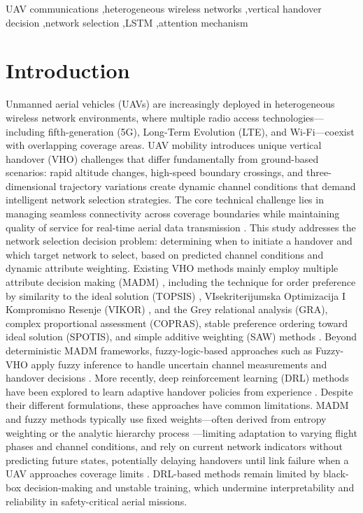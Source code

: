 \documentclass[preprint,12pt]{elsarticle}
\begin{document}
\begin{frontmatter}
\begin{keyword}
UAV communications \sep heterogeneous wireless networks \sep vertical handover decision \sep network selection \sep LSTM \sep attention mechanism
\end{keyword}

\end{frontmatter}
\normalsize

\section{Introduction}\label{sec:intro}

Unmanned aerial vehicles (UAVs) are increasingly deployed in heterogeneous wireless network environments, where multiple radio access technologies—including fifth-generation (5G), Long-Term Evolution (LTE), and Wi-Fi—coexist with overlapping coverage areas. UAV mobility introduces unique vertical handover (VHO) challenges that differ fundamentally from ground-based scenarios: rapid altitude changes, high-speed boundary crossings, and three-dimensional trajectory variations create dynamic channel conditions that demand intelligent network selection strategies. The core technical challenge lies in managing seamless connectivity across coverage boundaries while maintaining quality of service for real-time aerial data transmission \cite{ref1,ref2,ref3}. This study addresses the network selection decision problem: determining when to initiate a handover and which target network to select, based on predicted channel conditions and dynamic attribute weighting. Existing VHO methods mainly employ multiple attribute decision making (MADM) \cite{ref7}, including the technique for order preference by similarity to the ideal solution (TOPSIS) \cite{ref8,ref9,ref10}, VIsekriterijumska Optimizacija I Kompromisno Resenje (VIKOR) \cite{ref11}, and the Grey relational analysis (GRA), complex proportional assessment (COPRAS), stable preference ordering toward ideal solution (SPOTIS), and simple additive weighting (SAW) methods \cite{ref12}. Beyond deterministic MADM frameworks, fuzzy-logic-based approaches such as Fuzzy-VHO apply fuzzy inference to handle uncertain channel measurements and handover decisions \cite{ref4}. More recently, deep reinforcement learning (DRL) methods have been explored to learn adaptive handover policies from experience \cite{ref16,ref17,ref18}. Despite their different formulations, these approaches have common limitations. MADM and fuzzy methods typically use fixed weights—often derived from entropy weighting or the analytic hierarchy process \cite{ref12,ref13,ref14,ref15}—limiting adaptation to varying flight phases and channel conditions, and rely on current network indicators without predicting future states, potentially delaying handovers until link failure when a UAV approaches coverage limits \cite{ref16,ref17}. DRL-based methods remain limited by black-box decision-making and unstable training, which undermine interpretability and reliability in safety-critical aerial missions.
\end{document}
